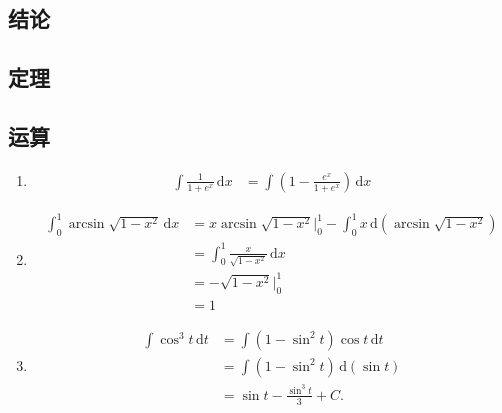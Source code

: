 \documentclass[a4paper,12pt]{article}
\begin{document}
    \subsection{结论}

    \begin{enumerate}
    \end{enumerate}

    \subsection{定理}

    \begin{enumerate}
    \end{enumerate}

    \subsection{运算}

    \begin{enumerate}

        \item
        \[
            \begin{aligned}
                \int \frac{1}{1+e^x}\,\mathrm{d}x
                &=
                \int \left(1 - \frac{e^x}{1+e^x}\right)\,\mathrm{d}x
            \end{aligned}
        \]

        \item
        \[
            \begin{aligned}
                \int_0^1 \arcsin \sqrt{1 - x^2}\,\mathrm{d}x
                &=
                x \arcsin \sqrt {1 - x^2}\Big|_0^1 - \int_0^1 x\,\mathrm{d}(\arcsin \sqrt{1 - x^2}) \\[6pt]
                &=
                \int_0^1 \frac{x}{\sqrt{1 - x^2}}\,\mathrm{d}x  \\[6pt]
                &=
                -\sqrt{1 - x^2}\Big|_0^1  \\[6pt]
                &=
                1
            \end{aligned}
        \]
        \item
        \[
            \begin{aligned}
                \int \cos^{3} t \,\mathrm{d}t
                &= \int (1 - \sin^2 t)\cos t \,\mathrm{d}t \\[6pt]
                &= \int (1-\sin^2 t)\,\mathrm{d}(\sin t) \\[6pt]
                &= \sin t - \frac{\sin^3 t}{3} + C.
            \end{aligned}
        \]

    \end{enumerate}
\end{document}
